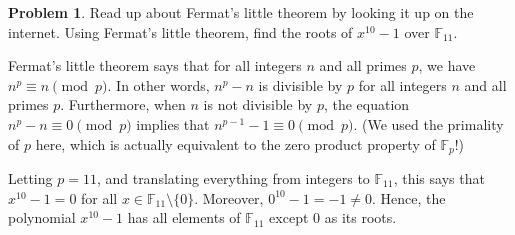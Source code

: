 \documentclass[11pt,oneside]{amsart}
\theoremstyle{definition}
\newtheorem{problem}{Problem}
\newcommand{\bF}{\mathbb{F}}
\begin{document}
    \begin{problem}
        Read up about Fermat's little theorem by looking it up on the internet. Using Fermat's little theorem, find the roots of $x^{10}-1$ over $\bF_{11}$.
    \end{problem}
    \begin{solution}
        Fermat's little theorem says that for all integers $n$ and all primes $p$, we have $n^p\equiv n\pmod p$. In other words, $n^p-n$ is divisible by $p$ for all integers $n$ and all primes $p$. Furthermore, when $n$ is not divisible by $p$, the equation $n^p-n\equiv 0\pmod p$ implies that $n^{p-1}-1\equiv 0\pmod p$. (We used the primality of $p$ here, which is actually equivalent to the zero product property of $\bF_p$!)
        
        Letting $p=11$, and translating everything from integers to $\bF_{11}$, this says that $x^{10}-1=0$ for all $x\in\bF_{11}\setminus\{0\}$. Moreover, $0^{10}-1=-1\neq 0$. Hence, the polynomial $x^{10}-1$ has all elements of $\bF_{11}$ except 0 as its roots.
    \end{solution}
\end{document}
